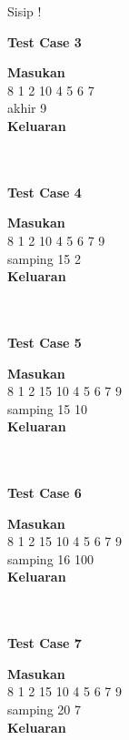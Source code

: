 \begin{permasalahan}{Sisip !}
	\begin{center}
	\textbf{Test Case 3}\\
	\end{center}
	\textbf{Masukan}\\
	8 1 2 10 4 5 6 7\\
   akhir 9\\
	\textbf{Keluaran}\\
	\big[8, 1, 2, 10, 4, 5, 6, 7, 9\big] 	 \\\\

	\begin{center}
	\textbf{Test Case 4}\\
	\end{center}
	\textbf{Masukan}\\
	8 1 2 10 4 5 6 7 9\\
   samping 15 2\\
	\textbf{Keluaran}\\
	\big[8, 1, 2, 15, 10, 4, 5, 6, 7, 9\big] 	 \\\\
		

	\begin{center}
	\textbf{Test Case 5}\\
	\end{center}
	\textbf{Masukan}\\
8 1 2 15 10 4 5 6 7 9\\
samping 15 10\\
	\textbf{Keluaran}\\
	\big[8, 1, 2, 15, 10, 4, 5, 6, 7, 9\big] 	 \\\\
	
	
		\begin{center}
	\textbf{Test Case 6}\\
	\end{center}
	\textbf{Masukan}\\
8 1 2 15 10 4 5 6 7 9\\
samping 16 100\\
	\textbf{Keluaran}\\
	\big[8, 1, 2, 15, 10, 4, 5, 6, 7, 9\big] 	 \\\\
	
			\begin{center}
	\textbf{Test Case 7}\\
	\end{center}
	\textbf{Masukan}\\
8 1 2 15 10 4 5 6 7 9\\
samping 20 7\\
	\textbf{Keluaran}\\
	\big[8, 1, 2, 15, 10, 4, 5, 6, 7, 20, 9\big] 	 \\\\
\end{permasalahan}







